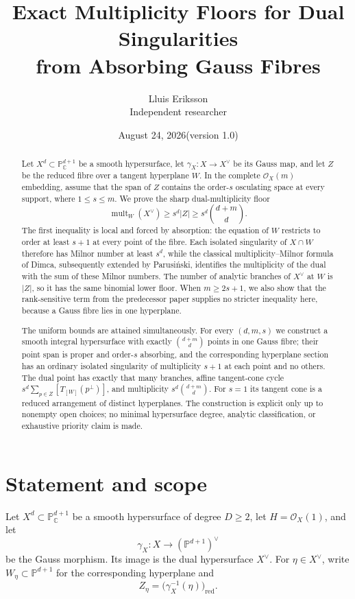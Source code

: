 \documentclass[11pt,a4paper]{article}
\title{Exact Multiplicity Floors for Dual Singularities\\
from Absorbing Gauss Fibres}
\author{Lluis Eriksson\\\small Independent researcher}
\date{August 24, 2026\quad (version 1.0)}
\theoremstyle{definition}
\newcommand{\kk}{\mathbb C}
\newcommand{\PP}{\mathbb P}
\newcommand{\cO}{\mathcal O}
\newcommand{\mult}{\operatorname{mult}}
\begin{document}
\maketitle

\begin{abstract}
Let $X^d\subset\PP^{d+1}_{\mathbb C}$ be a smooth hypersurface, let
$\gamma_X:X\to X^\vee$ be its Gauss map, and let $Z$ be the reduced fibre
over a tangent hyperplane $W$.  In the complete $\cO_X(m)$ embedding, assume
that the span of $Z$ contains the order-$s$ osculating space at every support,
where $1\leq s\leq m$.  We prove the sharp dual-multiplicity floor
\[
 \mult_W(X^\vee)\geq s^d|Z|
 \geq s^d\binom{d+m}{d}.
\]
The first inequality is local and forced by absorption: the equation of $W$
restricts to order at least $s+1$ at every point of the fibre.  Each isolated
singularity of $X\cap W$ therefore has Milnor number at least $s^d$, while
the classical multiplicity--Milnor formula of Dimca, subsequently extended
by Parusi\'nski, identifies the multiplicity of the dual with the sum of
these Milnor numbers.  The number of analytic branches of
$X^\vee$ at $W$ is $|Z|$, so it has the same binomial lower floor.  When
$m\geq2s+1$, we also show that the rank-sensitive term from the predecessor
paper supplies no stricter inequality here, because a Gauss fibre lies in one
hyperplane.

The uniform bounds are attained simultaneously.  For every $(d,m,s)$ we construct a
smooth integral hypersurface with exactly
$\binom{d+m}{d}$ points in one Gauss fibre; their point span is proper and
order-$s$ absorbing, and the corresponding hyperplane section has an ordinary
isolated singularity of multiplicity $s+1$ at each point and no others.  The
dual point has exactly that many branches, affine tangent-cone cycle
$s^d\sum_{p\in Z}[T_{[W]}(p^\perp)]$, and multiplicity
$s^d\binom{d+m}{d}$.  For $s=1$ its tangent cone is a reduced arrangement of
distinct hyperplanes.  The construction is explicit only up to nonempty open
choices; no minimal hypersurface degree, analytic classification, or
exhaustive priority claim is made.
\end{abstract}

\section{Statement and scope}

Let $X^d\subset\PP^{d+1}_{\kk}$ be a smooth hypersurface of degree $D\geq2$,
let $H=\cO_X(1)$, and let
\[
 \gamma_X:X\longrightarrow (\PP^{d+1})^\vee
\]
be the Gauss morphism.  Its image is the dual hypersurface $X^\vee$.
For $\eta\in X^\vee$, write $W_\eta\subset\PP^{d+1}$ for the corresponding
hyperplane and
\[
 Z_\eta=\bigl(\gamma_X^{-1}(\eta)\bigr)_{\mathrm{red}}.
\]
\end{document}
